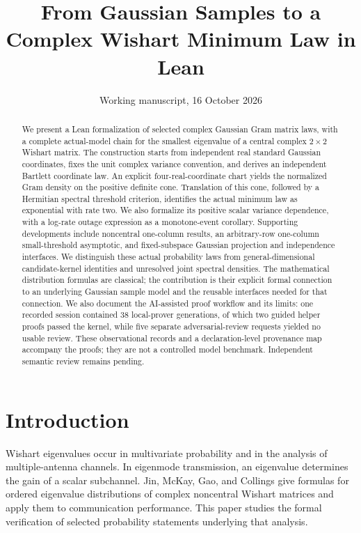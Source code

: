\documentclass[11pt]{article}
\title{From Gaussian Samples to a Complex Wishart Minimum Law in Lean}
\author{}
\date{Working manuscript, 16 October 2026}
\begin{document}
\maketitle
\begin{abstract}
We present a Lean formalization of selected complex Gaussian Gram matrix laws,
with a complete actual-model chain for the smallest eigenvalue of a central
complex $2\times2$ Wishart matrix. The construction starts from independent real
standard Gaussian coordinates, fixes the unit complex variance convention, and
derives an independent Bartlett coordinate law. An explicit four-real-coordinate
chart yields the normalized Gram density on the positive definite cone.
Translation of this cone, followed by a Hermitian spectral threshold criterion,
identifies the actual minimum law as exponential with rate two. We also formalize
its positive scalar variance dependence, with a log-rate outage expression as
a monotone-event corollary. Supporting developments include noncentral one-column results,
an arbitrary-row one-column small-threshold asymptotic, and fixed-subspace
Gaussian projection and independence interfaces. We distinguish these actual
probability laws from general-dimensional candidate-kernel identities and
unresolved joint spectral densities. The mathematical distribution formulas
are classical; the contribution is their explicit formal connection to an
underlying Gaussian sample model and the reusable interfaces needed for that
connection. We also document the AI-assisted proof workflow and its limits:
one recorded session contained 38 local-prover generations, of which two guided
helper proofs passed the kernel, while five separate adversarial-review
requests yielded no usable review. These observational records and a
declaration-level provenance map accompany the proofs; they are not a
controlled model benchmark. Independent semantic review remains pending.
\end{abstract}

\section{Introduction}
Wishart eigenvalues occur in multivariate probability and in the analysis of
multiple-antenna channels. In eigenmode transmission, an eigenvalue determines
the gain of a scalar subchannel. Jin, McKay, Gao, and Collings
\cite{jin} give formulas for ordered eigenvalue distributions of complex
noncentral Wishart matrices and apply them to communication performance.
This paper studies the formal verification of selected probability statements
underlying that analysis.
\end{document}
